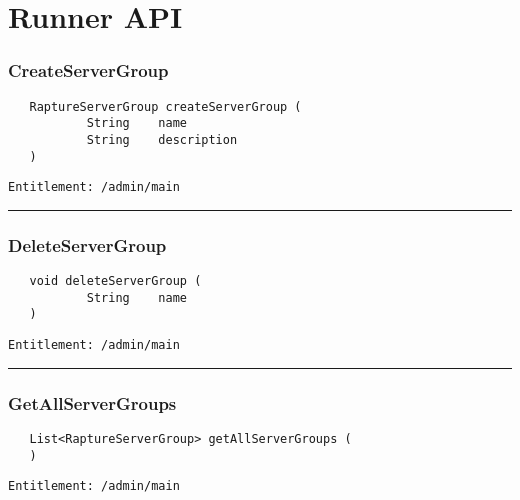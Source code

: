 \chapter{Runner API}

\subsection{CreateServerGroup}
\label{Api:CreateServerGroup}
\begin{Verbatim}
   RaptureServerGroup createServerGroup (
           String    name
           String    description
   )
\end{Verbatim}
\begin{Verbatim}[formatcom=\color{Maroon}]
  Entitlement: /admin/main
\end{Verbatim}



\rule{12cm}{2pt}
\subsection{DeleteServerGroup}
\label{Api:DeleteServerGroup}
\begin{Verbatim}
   void deleteServerGroup (
           String    name
   )
\end{Verbatim}
\begin{Verbatim}[formatcom=\color{Maroon}]
  Entitlement: /admin/main
\end{Verbatim}



\rule{12cm}{2pt}
\subsection{GetAllServerGroups}
\label{Api:GetAllServerGroups}
\begin{Verbatim}
   List<RaptureServerGroup> getAllServerGroups (
   )
\end{Verbatim}
\begin{Verbatim}[formatcom=\color{Maroon}]
  Entitlement: /admin/main
\end{Verbatim}



